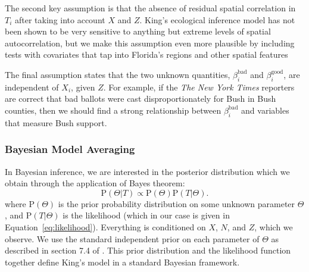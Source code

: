 \documentclass[11pt,titlepage]{article}
\renewcommand{\P}{\text{P}}
\newcommand{\bb}{\beta^{\text{bad}}}
\newcommand{\bg}{\beta^{\text{good}}}
\begin{document}
The second key assumption is that the absence of residual spatial
correlation in $T_i$ after taking into account $X$ and $Z$.  King's
ecological inference model has not been shown to be very sensitive to
anything but extreme levels of spatial autocorrelation, but we make
this assumption even more plausible by including tests with covariates
that tap into Florida's regions and other spatial features

The final assumption states that the two unknown quantities, $\bb_i$
and $\bg_i$, are independent of $X_i$, given $Z$.  For example, if the
\textit{The New York Times} reporters are correct that bad ballots
were cast disproportionately for Bush in Bush counties, then we should
find a strong relationship between $\bb_i$ and variables that measure
Bush support.

\subsubsection{Bayesian Model Averaging}

In Bayesian inference, we are interested in the posterior distribution
which we obtain through the application of Bayes theorem:
\begin{equation}
  \P(\Theta|T) \propto \P(\Theta)\P(T|\Theta).\label{eq:post}
\end{equation}
where $\P(\Theta)$ is the prior probability distribution on some
unknown parameter $\Theta$, and $\P(T|\Theta)$ is the likelihood
(which in our case is given in Equation~\ref{eq:likelihood}).
Everything is conditioned on $X$, $N$, and $Z$, which we observe. We
use the standard independent prior on each parameter of $\Theta$ as
described in section 7.4 of \citet{king:97}.  This prior distribution
and the likelihood function together define King's model in a standard
Bayesian framework.
\end{document}
